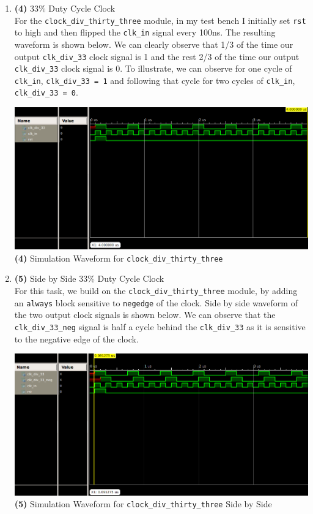 \documentclass{article}
\begin{document}
\begin{enumerate}
    \item \textbf{(4)} 33\% Duty Cycle Clock  \\
    For the \texttt{clock\_div\_thirty\_three} module, in my test bench I initially set \texttt{rst} to high and then flipped the \texttt{clk\_in} signal every 100ns. The resulting waveform is shown below. We can clearly observe that 1/3 of the time our output \texttt{clk\_div\_33} clock signal is 1 and the rest 2/3 of the time our output \texttt{clk\_div\_33} clock signal is 0. To illustrate, we can observe for one cycle of \texttt{clk\_in}, \texttt{clk\_div\_33 = 1} and following that cycle for two cycles of \texttt{clk\_in}, \texttt{clk\_div\_33 = 0}.
    \begin{center}
        \includegraphics[scale=0.4]{waveform-4.png} \\
        \caption{\textbf{(4)} Simulation Waveform for \texttt{clock\_div\_thirty\_three}}
    \end{center}

    \item \textbf{(5)} Side by Side 33\% Duty Cycle Clock  \\
    For this task, we build on the \texttt{clock\_div\_thirty\_three} module, by adding an \texttt{always} block sensitive to \texttt{negedge} of the clock. Side by side waveform of the two output clock signals is shown below. We can observe that the \texttt{clk\_div\_33\_neg} signal is half a cycle behind the \texttt{clk\_div\_33} as it is sensitive to the negative edge of the clock.
    \begin{center}
        \includegraphics[scale=0.4]{waveform-5.png} \\
        \caption{\textbf{(5)} Simulation Waveform for \texttt{clock\_div\_thirty\_three} Side by Side}
    \end{center}
    

\end{enumerate}
\end{document}
